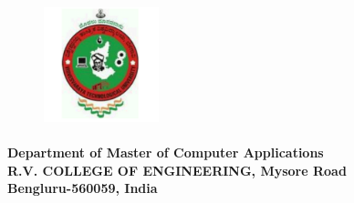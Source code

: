 \begin{center}
\begin{figure}[!ht]
\centering
\includegraphics[height=36.068mm,width=33.274mm]{VTU_Logo}
\end{figure}

\vspace*{3mm}

\fontsize{14pt}{16.8pt}\selectfont\textbf{Department of Master of Computer Applications  \\
\vspace*{2mm} R.V.  COLLEGE OF ENGINEERING, Mysore Road} \\
\vspace*{2mm}
\fontsize{14pt}{16.8pt}\selectfont\textbf{Bengluru-560059, India} 
\vspace*{10mm}\\

\end{center}
